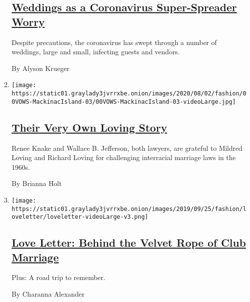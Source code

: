 \begin{enumerate}
  \hypertarget{weddings-as-a-coronavirus-super-spreader-worry}{%
  \subsection{\texorpdfstring{\href{/2020/08/04/fashion/weddings/weddings-as-covid-super-spreaders.html}{Weddings
  as a Coronavirus Super-Spreader
  Worry}}{Weddings as a Coronavirus Super-Spreader Worry}}\label{weddings-as-a-coronavirus-super-spreader-worry}}

  Despite precautions, the coronavirus has swept through a number of
  weddings, large and small, infecting guests and vendors.

  By Alyson Krueger
\item
  \texttt{[image: https://static01.graylady3jvrrxbe.onion/images/2020/08/02/fashion/00VOWS-MackinacIsland-03/00VOWS-MackinacIsland-03-videoLarge.jpg]}

  \hypertarget{their-very-own-loving-story}{%
  \subsection{\texorpdfstring{\href{/2020/07/31/fashion/weddings/Renee-Knake-and-Wallace-Jefferson-wed-tribute-to-Lovings-before-them.html}{Their
  Very Own Loving
  Story}}{Their Very Own Loving Story}}\label{their-very-own-loving-story}}

  Renee Knake and Wallace B. Jefferson, both lawyers, are grateful to
  Mildred Loving and Richard Loving for challenging interracial marriage
  laws in the 1960s.

  By Brianna Holt
\item
  \texttt{[image: https://static01.graylady3jvrrxbe.onion/images/2019/09/25/fashion/loveletter/loveletter-videoLarge-v3.png]}

  \hypertarget{love-letter-behind-the-velvet-rope-of-club-marriage-1}{%
  \subsection{\texorpdfstring{\href{/2020/08/07/style/love-letter-newsletter-behind-the-velvet-rope-of-club-marriage.html}{Love
  Letter: Behind the Velvet Rope of Club
  Marriage}}{Love Letter: Behind the Velvet Rope of Club Marriage}}\label{love-letter-behind-the-velvet-rope-of-club-marriage-1}}

  Plus: A road trip to remember.

  By Charanna Alexander
\end{enumerate}

